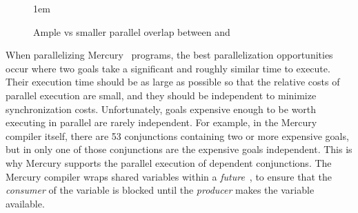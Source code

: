 % 
% 

\begin{figure}[tb]
\begin{center}

\centerline{\raise 1em\box\graph}
\end{center}
\caption{Ample vs smaller parallel overlap between  and }
\label{fig:dep_conj_overlap1}
\end{figure}




When parallelizing Mercury~\cite{jlp} programs,
the best parallelization opportunities occur
where two goals take a significant and roughly similar time to execute.
Their execution time should be as large as possible
so that the relative costs of parallel execution are small,
and they should be independent to minimize synchronization costs.
Unfortunately, goals expensive enough to be worth executing in parallel
are rarely independent.
For example, in the Mercury compiler itself,
there are 53 conjunctions containing two or more expensive goals,
but in only one of those conjunctions are the expensive goals independent.
This is why Mercury supports the parallel execution of dependent conjunctions.
The Mercury compiler wraps shared variables within a
\emph{future}~\cite{wang_dep_par_conj}, to
ensure that the \emph{consumer} of the variable is blocked
until the \emph{producer} makes the variable available.

